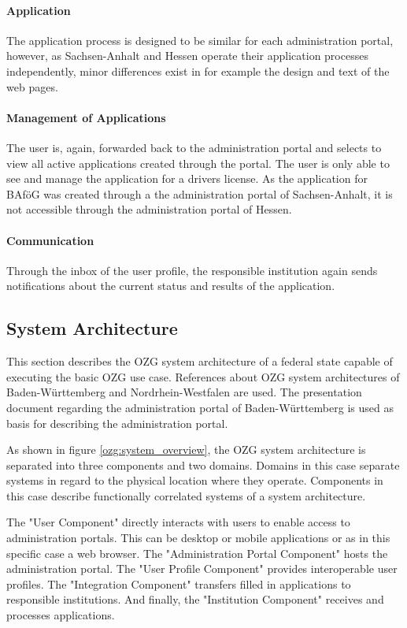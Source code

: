 \paragraph{Application} The application process is designed to be similar for each administration portal, however, as Sachsen-Anhalt and Hessen operate their application processes independently, minor differences exist in for example the design and text of the web pages.

\paragraph{Management of Applications} The user is, again, forwarded back to the administration portal and selects to view all active applications created through the portal. The user is only able to see and manage the application for a drivers license. As the application for BAföG was created through a the administration portal of Sachsen-Anhalt, it is not accessible through the administration portal of Hessen.

\paragraph{Communication} Through the inbox of the user profile, the responsible institution again sends notifications about the current status and results of the application.

\subsection{System Architecture}
This section describes the OZG system architecture of a federal state capable of executing the basic OZG use case. References about OZG system architectures of Baden-Württemberg \cite{ozg:bw} and Nordrhein-Westfalen \cite{ozg:nrw} are used. The presentation document regarding the administration portal of Baden-Württemberg \cite{ozg:bw_administration_portal} is used as basis for describing the administration portal.

As shown in figure \ref{ozg:system_overview}, the OZG system architecture is separated into three components and two domains. Domains in this case separate systems in regard to the physical location where they operate. Components in this case describe functionally correlated systems of a system architecture.

The "User Component" directly interacts with users to enable access to administration portals. This can be desktop or mobile applications or as in this specific case a web browser. The "Administration Portal Component" hosts the administration portal. The "User Profile Component" provides interoperable user profiles. The "Integration Component" transfers filled in applications to responsible institutions. And finally, the "Institution Component" receives and processes applications.

